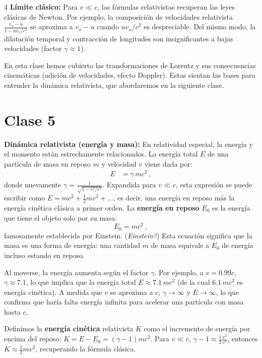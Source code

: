 \documentclass[landscape,10pt]{article}
\begin{document}
\begin{multicols}{4}
\columnbreak
\noindent \textbf{Límite clásico:} Para $v \ll c$, las fórmulas relativistas recuperan las leyes clásicas de Newton. Por ejemplo, la composición de velocidades relativista $\frac{v_x - u}{1 - uv_x/c^2}$ se aproxima a $v_x - u$ cuando $uv_x/c^2$ es despreciable. Del mismo modo, la dilatación temporal y contracción de longitudes son insignificantes a bajas velocidades (factor $\gamma \approx 1$).

En esta clase hemos cubierto las transformaciones de Lorentz y sus consecuencias cinemáticas (adición de velocidades, efecto Doppler). Estas sientan las bases para entender la dinámica relativista, que abordaremos en la siguiente clase.

\bigskip
\section*{Clase 5}

\noindent \textbf{Dinámica relativista (energía y masa):} En relatividad especial, la energía y el momento están estrechamente relacionados. La energía total $E$ de una partícula de masa en reposo $m$ y velocidad $v$ viene dada por:
\begin{align*}
E &= \gamma\, m c^2~,
\end{align*}
donde nuevamente $\gamma = \frac{1}{\sqrt{1 - v^2/c^2}}$. Expandida para $v \ll c$, esta expresión se puede escribir como $E = m c^2 + \frac{1}{2}m v^2 + \dots$, es decir, una energía en reposo más la energía cinética clásica a primer orden. La \textbf{energía en reposo} $E_0$ es la energía que tiene el objeto solo por su masa:
\[
E_0 = m c^2~,
\] 
famosamente establecida por Einstein. (\textit{Einstein?}) Esta ecuación significa que la masa es una forma de energía: una cantidad $m$ de masa equivale a $E_0$ de energía incluso estando en reposo. 

Al moverse, la energía aumenta según el factor $\gamma$. Por ejemplo, a $v = 0.99c$, $\gamma \approx 7.1$, lo que implica que la energía total $E \approx 7.1\, m c^2$ (de la cual $6.1\, mc^2$ es energía cinética). A medida que $v$ se aproxima a $c$, $\gamma \to \infty$ y $E \to \infty$, lo que confirma que haría falta energía infinita para acelerar una partícula con masa hasta $c$.

Definimos la \textbf{energía cinética} relativista $K$ como el incremento de energía por encima del reposo: $K = E - E_0 = (\gamma - 1) m c^2$. Para $v \ll c$, $\gamma - 1 \approx \frac{1}{2} \frac{v^2}{c^2}$, entonces $K \approx \frac{1}{2} m v^2$, recuperando la fórmula clásica.


\end{multicols}
\end{document}
